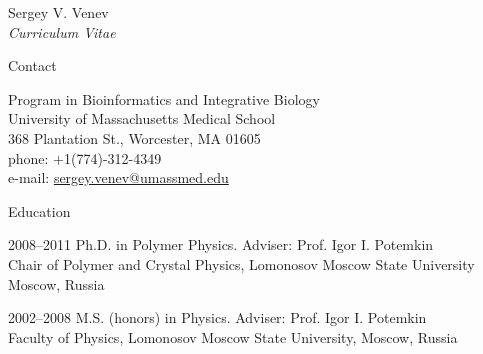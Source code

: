 \documentclass[10pt]{article}
\begin{document}




\newlength{\oldcvlabelwidth}
\renewcommand*{\cvbibname}{}

\begin{cv}{Sergey V. Venev\\{\large \itshape Curriculum Vitae}}

\begin{cvlist}{Contact}
    \item Program in Bioinformatics and Integrative Biology\\
    University of Massachusetts Medical School\\
    368 Plantation St., Worcester, MA 01605\\
    phone: +1(774)-312-4349\\
    e-mail: \href{mailto:sergey.venev@umassmed.edu}{sergey.venev@umassmed.edu}
\end{cvlist}


\begin{cvlist}{Education}
    \item[2008--2011] Ph.D. in Polymer Physics. Adviser: Prof. Igor I. Potemkin\\
    Chair of Polymer and Crystal Physics, Lomonosov Moscow State University\\
    Moscow, Russia  
    \item[2002--2008] M.S. (honors) in Physics. Adviser: Prof. Igor I. Potemkin\\
    Faculty of Physics, Lomonosov Moscow State University,
    Moscow, Russia  
\end{cvlist}




\end{cv}
\end{document}
